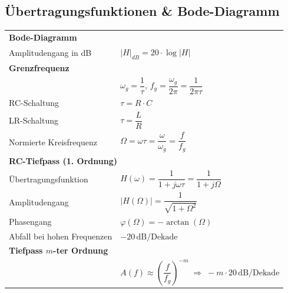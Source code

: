 \documentclass[a4paper,12pt]{scrartcl}
\begin{document}
\subsection{Übertragungsfunktionen \& Bode-Diagramm}
\begin{tabular}{@{} l l @{}}

\multicolumn{2}{l}{\textbf{Bode-Diagramm}} \\
\hspace*{20mm} Amplitudengang in dB & $|H|_{dB} = 20\cdot\log|H|$ \\[3mm]

\multicolumn{2}{l}{\textbf{Grenzfrequenz}} \\
& $\omega_g = \dfrac{1}{\tau}$, \quad $f_g = \dfrac{\omega_g}{2\pi} = \dfrac{1}{2\pi\tau}$ \\
\hspace*{20mm} RC-Schaltung & $\tau = R\cdot C$ \\
\hspace*{20mm} LR-Schaltung & $\tau = \dfrac{L}{R}$ \\
\hspace*{20mm} Normierte Kreisfrequenz & $\Omega = \omega\tau = \dfrac{\omega}{\omega_g} = \dfrac{f}{f_g}$ \\[3mm]

\multicolumn{2}{l}{\textbf{RC-Tiefpass (1. Ordnung)}} \\
\hspace*{20mm} Übertragungsfunktion & $H(\omega) = \dfrac{1}{1 + j\omega\tau} = \dfrac{1}{1 + j\Omega}$ \\
\hspace*{20mm} Amplitudengang & $|H(\Omega)| = \dfrac{1}{\sqrt{1 + \Omega^2}}$ \\
\hspace*{20mm} Phasengang & $\varphi(\Omega) = -\arctan(\Omega)$ \\
\hspace*{20mm} Abfall bei hohen Frequenzen & $-20\,\text{dB/Dekade}$ \\[3mm]

\multicolumn{2}{l}{\textbf{Tiefpass $m$-ter Ordnung}} \\
& $A(f) \approx \left(\dfrac{f}{f_g}\right)^{-m} \;\Rightarrow\; -m\cdot 20\,\text{dB/Dekade}$ \\

\end{tabular}
\end{document}
